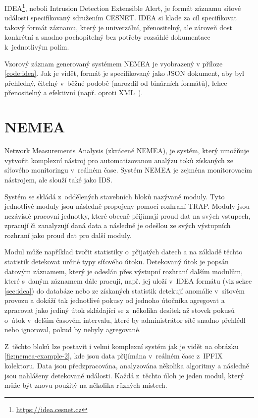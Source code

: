 IDEA\footnote{\url{https://idea.cesnet.cz}}, neboli Intrusion Detection Extensible Alert, je formát záznamu síťové události specifikovaný sdružením CESNET. IDEA si klade za cíl specifikovat takový formát záznamu, který je univerzální, přenositelný, ale zároveň dost konkrétní a snadno pochopitelný bez potřeby rozsáhlé dokumentace k~jednotlivým polím.

Vzorový záznam generovaný systémem NEMEA je vyobrazený v příloze \ref{code:idea}. Jak je vidět, formát je specifikovaný jako JSON dokument, aby byl přehledný, čitelný v~běžné podobě (narozdíl od binárních formátů), lehce přenositelný a efektivní (např. oproti XML~\cite{xmlvsjson}).

\section{NEMEA}

Network Measurements Analysis (zkráceně NEMEA), je systém, který umožňuje vytvořit komplexní nástroj pro automatizovanou analýzu toků získaných ze síťového monitoringu v~reálném čase. Systém NEMEA je zejména monitorovacím nástrojem, ale slouží také jako IDS.

Systém se skládá z~oddělených stavebních bloků nazývané moduly. Tyto jednotlivé moduly jsou následně propojeny pomocí rozhraní TRAP. Moduly jsou nezávislé pracovní jednotky, které obecně přijímají proud dat na svých vstupech, zpracují či zanalyzují daná data a následně je odešlou ze svých výstupních rozhraní jako proud dat pro další moduly. 

Modul může například tvořit statistiky o~přijatých datech a na základě těchto statistik detekovat určité typy síťového útoku. Detekovaný útok je popsán datovým záznamem, který je odeslán přes výstupní rozhraní dalším modulům, které s~daným záznamem dále pracují, např. jej uloží v~IDEA formátu (viz sekce \ref{sec:idea}) do databáze nebo ze získaných statistik detekují anomálie v~síťovém provozu a dokáží tak jednotlivé pokusy od jednoho útočníka agregovat a zpracovat jako jediný útok skládající se z~několika desítek až stovek pokusů o~útok v~delším časovém intervalu, které by administrátor sítě snadno přehlédl nebo ignoroval, pokud by nebyly agregované.

Z~těchto bloků lze postavit i velmi komplexní systém jak je vidět na obrázku \ref{fig:nemea-example-2}, kde jsou data přijímána v~reálném čase z~IPFIX\cite{ipfix} kolektoru. Data jsou předzpracována, analyzována několika algoritmy a následně jsou nahlášeny detekované události. Každá z~těchto úloh je jeden modul, který může být znovu použitý na několika různých místech.

